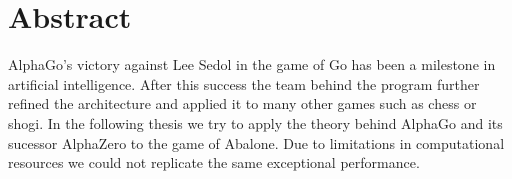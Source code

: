 \chapter*{Abstract}

AlphaGo's victory against Lee Sedol in the game of Go has been a milestone in artificial intelligence. After this success the team behind the program further refined the architecture and applied it to many other games such as chess or shogi. In the following thesis we try to apply the theory behind AlphaGo and its sucessor AlphaZero to the game of Abalone. Due to limitations in computational resources we could not replicate the same exceptional performance.